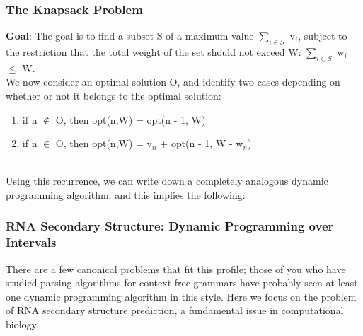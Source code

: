 \documentclass{article}
\begin{document}
\subsubsection{The Knapsack Problem}
\textbf{Goal}: The goal is to find a subset S of a maximum value $\sum_{i \in S}^{}$ v$_i$, subject to the restriction that the total weight of the set should not exceed W: $\sum_{i \in S}^{}$ w$_i$ $\le$ W.\\

We now consider an optimal solution O, and identify two cases depending on whether or not it belongs to the optimal solution:\\

\begin{enumerate}
    \item if n $\notin$ O, then opt(n,W) = opt(n - 1, W)
    \item if n $\in$ O, then opt(n,W) = v$_n$ + opt(n - 1, W - w$_n$)
\end{enumerate}

\\

Using this recurrence, we can write down a completely analogous dynamic programming algorithm, and this implies the following:\\

\begin{center}
\end{center}

\subsubsection{RNA Secondary Structure: Dynamic Programming over Intervals}
There are a few canonical problems that fit this profile; those of you who have studied parsing algorithms for context-free grammars have probably seen at least one dynamic programming algorithm in this style. Here we focus on the problem of RNA secondary structure prediction, a fundamental issue in computational biology.
\end{document}
